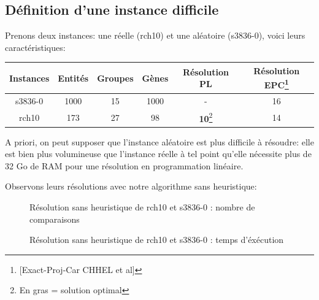 \documentclass[a4paper,10pt]{article}
\begin{document}
\subsection{Définition d'une instance difficile}
Prenons deux instances: une réelle (rch10) et une aléatoire (s3836-0), voici leurs caractéristiques:
\begin{center}
\begin{tabular}{|c|c|c|c|c|c|}
\hline 
Instances & Entités & Groupes & Gènes & Résolution PL & Résolution EPC\footnote{[Exact-Proj-Car CHHEL et al]} \\ 
\hline 
s3836-0 & 1000 & 15 & 1000 & - & 16 \\ 
\hline
rch10 & 173 & 27 & 98 & \textbf{10}\footnote{En gras = solution optimal} & 14 \\ 
\hline
\end{tabular} 
\end{center}
\vspace{7mm}

A priori, on peut supposer que l'instance aléatoire est plus difficile à résoudre: elle est bien plus volumineuse que l'instance réelle à tel point qu'elle nécessite plus de 32 Go de RAM pour une résolution en programmation linéaire.

Observons leurs résolutions avec notre algorithme sans heuristique:

\begin{figure}[H]
\begin{center}
\end{center}
\caption{Résolution sans heuristique de rch10 et s3836-0 : nombre de comparaisons}
\end{figure}

\begin{figure}[H]
\begin{center}
\end{center}
\caption{Résolution sans heuristique de rch10 et s3836-0 : temps d'éxécution}
\end{figure}
\end{document}
